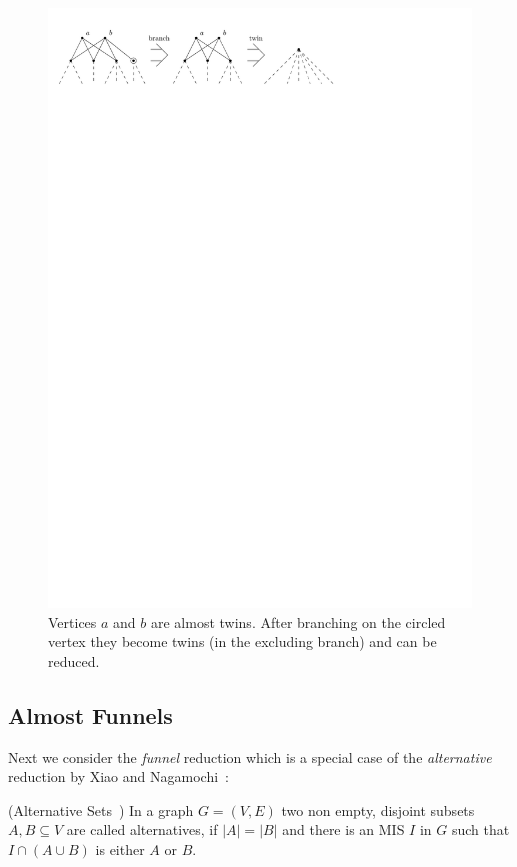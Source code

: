 \documentclass[a4paper,UKenglish,cleveref, autoref, thm-restate]{lipics-v2021}
\begin{document}
\begin{figure}[t]
  \centering
  \includegraphics[scale=1]{figures/twin}
  \caption{Vertices $a$ and $b$ are almost twins. After branching on
  the circled vertex they become twins (in the excluding branch) and can
  be reduced.}\label{fig:twin}
\end{figure}

\subsection{Almost Funnels}\label{sec:almost_funnels}

Next we consider the \emph{funnel} reduction which is a special case of the
\emph{alternative} reduction by Xiao and Nagamochi~\cite{XiaoUnconfined}:

\begin{definition} (Alternative Sets~\cite{XiaoUnconfined})
	In a graph $G=(V,E)$ two non empty, disjoint subsets $A,B\subseteq V$ are
    called alternatives, if $|A| = |B|$ and there is an MIS $I$ in $G$ such that $I\cap(A\cup B)$ is either $A$ or $B$.
\end{definition}
\end{document}
